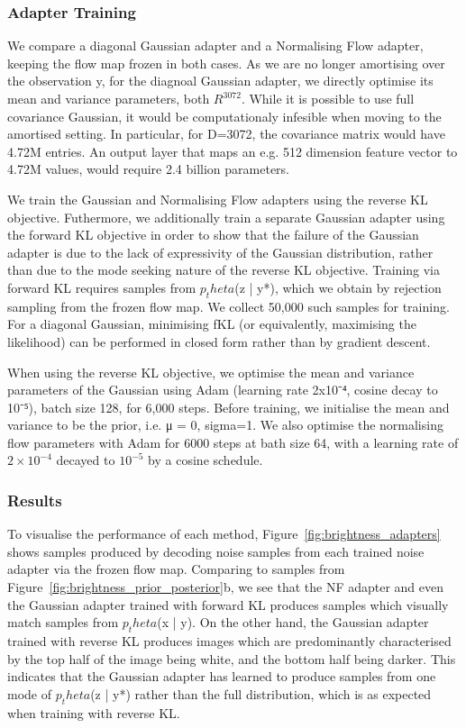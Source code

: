\documentclass[12pt,a4paper]{report}
\begin{document}
\subsubsection{Adapter Training}
We compare a diagonal Gaussian adapter and a Normalising Flow adapter, keeping the flow map frozen in both cases.
As we are no longer amortising over the observation y, for the diagnoal Gaussian adapter, we directly optimise its mean and variance parameters, both $R^3072$.
While it is possible to use full covariance Gaussian, it would be computationaly infesible when moving to the amortised setting. 
In particular, for D=3072, the covariance matrix would have 4.72M entries.
An output layer that maps an e.g. 512 dimension feature vector to 4.72M values, would require 2.4 billion parameters. 

We train the Gaussian and Normalising Flow adapters using the reverse KL objective. 
Futhermore, we additionally train a separate Gaussian adapter using the forward KL objective in order to show that the failure of the Gaussian adapter is due to the lack of expressivity of the Gaussian distribution, rather than due to the mode seeking nature of the reverse KL objective.
Training via forward KL requires samples from $p_theta$(z | y*), which we obtain by rejection sampling from the frozen flow map.
We collect 50,000 such samples for training. 
For a diagonal Gaussian, minimising fKL (or equivalently, maximising the likelihood) can be performed in closed form rather than by gradient descent. 

When using the reverse KL objective, we optimise the mean and variance parameters of the Gaussian using Adam (learning rate 2x10⁻⁴, cosine decay to 10⁻⁵), batch size 128, for 6,000 steps. Before training, we initialise the mean and variance to be the prior, i.e. μ = 0, sigma=1. 
We also optimise the normalising flow parameters with Adam for 6000 steps at bath size 64, with a learning rate of $2\times10^{-4}$ decayed to $10^{-5}$ by a cosine schedule.

\subsubsection{Results}
To visualise the performance of each method, Figure~\ref{fig:brightness_adapters} shows samples produced by decoding noise samples from each trained noise adapter via the frozen flow map. 
Comparing to samples from Figure~\ref{fig:brightness_prior_posterior}b, we see that the NF adapter and even the Gaussian adapter trained with forward KL produces samples which visually match samples from $p_theta$(x | y). 
On the other hand, the Gaussian adapter trained with reverse KL produces images which are predominantly characterised by the top half of the image being white, and the bottom half being darker. This indicates that the Gaussian adapter has learned to produce samples from one mode of $p_theta$(z | y*) rather than the full distribution, which is as expected when training with reverse KL.
\end{document}
